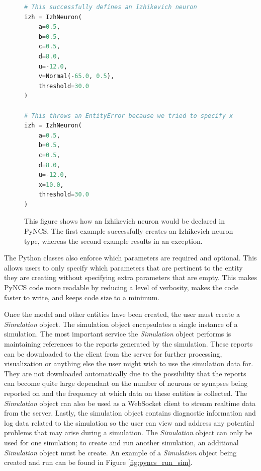 \begin{figure}
\begin{center}
\begin{lstlisting}[language=Python]
# This successfully defines an Izhikevich neuron
izh = IzhNeuron(
    a=0.5,
    b=0.5,
    c=0.5,
    d=8.0,
    u=-12.0,
    v=Normal(-65.0, 0.5),
    threshold=30.0
)

# This throws an EntityError because we tried to specify x
izh = IzhNeuron(
    a=0.5,
    b=0.5,
    c=0.5,
    d=8.0,
    u=-12.0,
    x=10.0,
    threshold=30.0
)
\end{lstlisting}
\caption[PyNCS Izhikevich Model]{This figure shows how an Izhikevich neuron would be declared in PyNCS. The first example successfully creates an Izhikevich neuron type, whereas the second example results in an exception.\label{fig:pyncs_izh}}
\end{center}
\end{figure}

The Python classes also enforce which parameters are required and optional. This allows users to only specify which parameters that are pertinent to the entity they are creating without specifying extra parameters that are empty. This makes PyNCS code more readable by reducing a level of verbosity, makes the code faster to write, and keeps code size to a minimum.

Once the model and other entities have been created, the user must create a \emph{Simulation} object. The simulation object encapsulates a single instance of a simulation. The most important service the \emph{Simulation} object performs is maintaining references to the reports generated by the simulation. These reports can be downloaded to the client from the server for further processing, visualization or anything else the user might wish to use the simulation data for. They are not downloaded automatically due to the possibility that the reports can become quite large dependant on the number of neurons or synapses being reported on and the frequency at which data on these entities is collected. The \emph{Simulation} object can also be used as a WebSocket client to stream realtime data from the server. Lastly, the simulation object contains diagnostic information and log data related to the simulation so the user can view and address any potential problems that may arise during a simulation. The \emph{Simulation} object can only be used for one simulation; to create and run another simulation, an additional \emph{Simulation} object must be create. An example of a \emph{Simulation} object being created and run can be found in Figure \ref{fig:pyncs_run_sim}.

